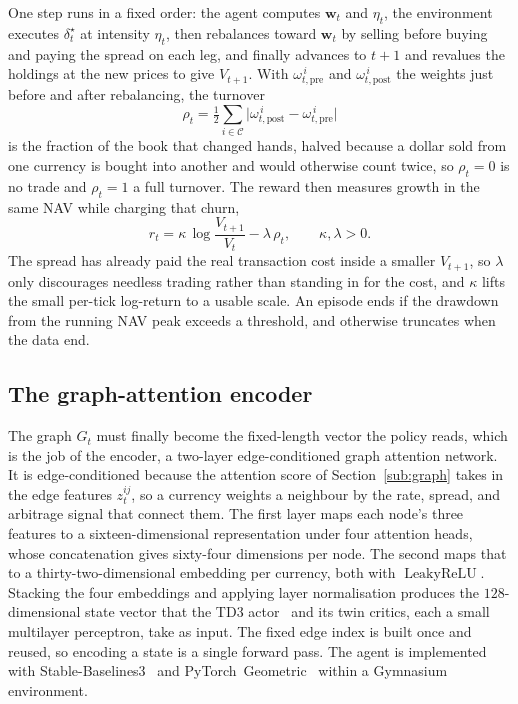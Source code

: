 \documentclass[12pt,a4paper]{article}
\begin{document}
One step runs in a fixed order: the agent computes $\mathbf{w}_t$ and $\eta_t$, the environment
executes $\delta_t^\star$ at intensity $\eta_t$, then rebalances toward $\mathbf{w}_t$ by selling
before buying and paying the spread on each leg, and finally advances to $t{+}1$ and revalues the
holdings at the new prices to give $V_{t+1}$. With $\omega^{\,i}_{t,\text{pre}}$ and
$\omega^{\,i}_{t,\text{post}}$ the weights just before and after rebalancing, the turnover
\begin{equation}
\rho_t=\tfrac12\sum_{i\in\mathcal{C}}\big|\omega^{\,i}_{t,\text{post}}-\omega^{\,i}_{t,\text{pre}}\big|
\label{eq:turnover}
\end{equation}
is the fraction of the book that changed hands, halved because a dollar sold from one currency is
bought into another and would otherwise count twice, so $\rho_t=0$ is no trade and $\rho_t=1$ a
full turnover. The reward then measures growth in the same NAV while charging that churn,
\begin{equation}
r_t=\kappa\,\log\!\frac{V_{t+1}}{V_t}-\lambda\,\rho_t,\qquad \kappa,\lambda>0.
\label{eq:reward}
\end{equation}
The spread has already paid the real transaction cost inside a smaller $V_{t+1}$, so $\lambda$
only discourages needless trading rather than standing in for the cost, and $\kappa$ lifts the
small per-tick log-return to a usable scale. An episode ends if the drawdown from the running NAV
peak exceeds a threshold, and otherwise truncates when the data end.

\subsection{The graph-attention encoder}

The graph $G_t$ must finally become the fixed-length vector the policy reads, which is the job of
the encoder, a two-layer edge-conditioned graph attention network. It is edge-conditioned because
the attention score of Section~\ref{sub:graph} takes in the edge features $z_t^{ij}$, so a
currency weights a neighbour by the rate, spread, and arbitrage signal that connect them. The
first layer maps each node's three features to a sixteen-dimensional representation under four
attention heads, whose concatenation gives sixty-four dimensions per node. The second maps that
to a thirty-two-dimensional embedding per currency, both with $\operatorname{LeakyReLU}$. Stacking
the four embeddings and applying layer normalisation produces the $128$-dimensional state vector
that the TD3 actor~\citep{fujimoto2018td3} and its twin critics, each a small multilayer
perceptron, take as input. The fixed edge index is built once and reused, so encoding a state is a
single forward pass. The agent is implemented with Stable-Baselines3~\citep{raffin2021sb3} and
PyTorch~Geometric~\citep{fey2019pyg} within a Gymnasium~\citep{towers2023gymnasium} environment.
\end{document}
